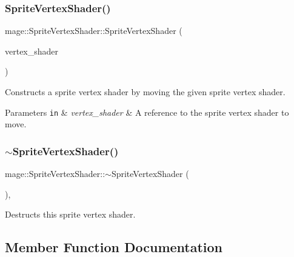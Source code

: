 \subsubsection{\texorpdfstring{Sprite\+Vertex\+Shader()}{SpriteVertexShader()}\hspace{0.1cm}{\footnotesize\ttfamily [4/4]}}
{\footnotesize\ttfamily mage\+::\+Sprite\+Vertex\+Shader\+::\+Sprite\+Vertex\+Shader (\begin{DoxyParamCaption}\item[{\hyperlink{classmage_1_1_sprite_vertex_shader}{Sprite\+Vertex\+Shader} \&\&}]{vertex\+\_\+shader }\end{DoxyParamCaption})\hspace{0.3cm}{\ttfamily [default]}}

Constructs a sprite vertex shader by moving the given sprite vertex shader.


\begin{DoxyParams}[1]{Parameters}
\mbox{\tt in}  & {\em vertex\+\_\+shader} & A reference to the sprite vertex shader to move. \\
\hline
\end{DoxyParams}
\hypertarget{classmage_1_1_sprite_vertex_shader_a36e755541ea81318ccf518533358e0d3}{}\label{classmage_1_1_sprite_vertex_shader_a36e755541ea81318ccf518533358e0d3} 
\subsubsection{\texorpdfstring{$\sim$\+Sprite\+Vertex\+Shader()}{~SpriteVertexShader()}}
{\footnotesize\ttfamily mage\+::\+Sprite\+Vertex\+Shader\+::$\sim$\+Sprite\+Vertex\+Shader (\begin{DoxyParamCaption}{ }\end{DoxyParamCaption})\hspace{0.3cm}{\ttfamily [virtual]}, {\ttfamily [default]}}

Destructs this sprite vertex shader. 

\subsection{Member Function Documentation}
\hypertarget{classmage_1_1_sprite_vertex_shader_a4400ddda9637b280b7c8aedeeec6e4e7}{}\label{classmage_1_1_sprite_vertex_shader_a4400ddda9637b280b7c8aedeeec6e4e7} 

